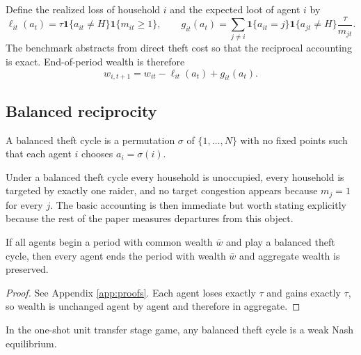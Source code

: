 Define the realized loss of household $i$ and the expected loot of agent $i$ by
\begin{equation}
\ell_{it}(a_t)
=
\tau \mathbf{1}\{a_{it}\neq H\}\mathbf{1}\{m_{it}\ge 1\},
\qquad
g_{it}(a_t)
=
\sum_{j\neq i}\mathbf{1}\{a_{it}=j\}\mathbf{1}\{a_{jt}\neq H\}\frac{\tau}{m_{jt}}.
\label{eq:loss-gain}
\end{equation}
The benchmark abstracts from direct theft cost so that the reciprocal accounting is exact. End-of-period wealth is therefore
\begin{equation}
w_{i,t+1} = w_{it} - \ell_{it}(a_t) + g_{it}(a_t).
\label{eq:benchmark-wealth-update}
\end{equation}

\subsection{Balanced reciprocity}

\begin{definition}
\label{def:balanced-cycle}
A balanced theft cycle is a permutation $\sigma$ of $\{1,\dots,N\}$ with no fixed points such that each agent $i$ chooses $a_i=\sigma(i)$.
\end{definition}

Under a balanced theft cycle every household is unoccupied, every household is targeted by exactly one raider, and no target congestion appears because $m_j=1$ for every $j$. The basic accounting is then immediate but worth stating explicitly because the rest of the paper measures departures from this object.

\begin{lemma}
\label{lem:balanced-accounting}
If all agents begin a period with common wealth $\bar{w}$ and play a balanced theft cycle, then every agent ends the period with wealth $\bar{w}$ and aggregate wealth is preserved.
\end{lemma}

\begin{proof}
See Appendix \ref{app:proofs}. Each agent loses exactly $\tau$ and gains exactly $\tau$, so wealth is unchanged agent by agent and therefore in aggregate.
\end{proof}

\begin{proposition}
\label{prop:balanced-cycle}
In the one-shot unit transfer stage game, any balanced theft cycle is a weak Nash equilibrium.
\end{proposition}

